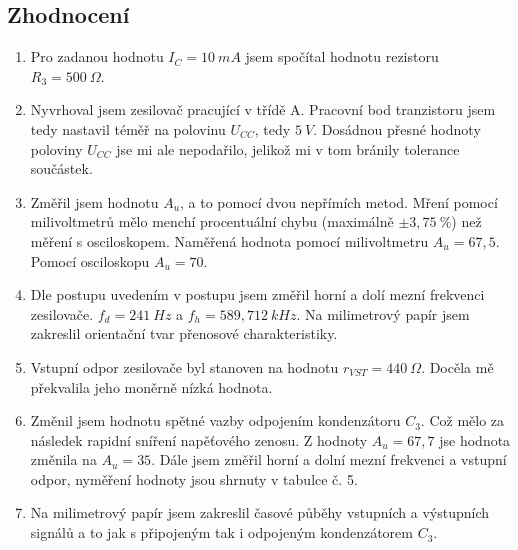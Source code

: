   \subsection*{Zhodnocení}
    \begin{enumerate}
      \item
        Pro zadanou hodnotu $I_C = 10~mA$ jsem spočítal hodnotu rezistoru $R_3 = 500~\Omega$.
      \item
        Nyvrhoval jsem zesilovač pracující v třídě A. Pracovní bod tranzistoru jsem tedy nastavil téměř na polovinu $U_{CC}$, tedy $5~V$. Dosádnou přesné hodnoty poloviny $U_{CC}$ jse mi ale nepodařilo, jelikož mi v tom bránily tolerance součástek.
      \item
      	Změřil jsem hodnotu $A_u$, a to pomocí dvou nepřímích metod. Mření pomocí milivoltmetrů mělo menchí procentuální chybu (maximálně $\pm 3,75~\%$) než měření s osciloskopem. Naměřená hodnota pomocí milivoltmetru $A_u = 67,5$. Pomocí osciloskopu $A_u = 70$.
      \item
        Dle postupu uvedením v postupu jsem změřil horní a dolí mezní frekvenci zesilovače. $f_d = 241~Hz$ a $f_h = 589,712~kHz$. Na milimetrový papír jsem zakreslil orientační tvar přenosové charakteristiky.
      \item
        Vstupní odpor zesilovače byl stanoven na hodnotu $r_{VST} = 440~\Omega$. Docěla mě překvalila jeho moněrně nízká hodnota.
      \item
      	Změnil jsem hodnotu spětné vazby odpojením kondenzátoru $C_3$. Což mělo za následek rapidní sníření napěťového zenosu. Z hodnoty $A_u = 67,7$ jse hodnota změnila na $A_u = 35$. Dále jsem změřil horní a dolní mezní frekvenci a vstupní odpor, nyměření hodnoty jsou shrnuty v tabulce č. 5.
      \item
      	Na milimetrový papír jsem zakreslil časové půběhy vstupních a výstupních signálů a to jak s připojeným tak i odpojeným kondenzátorem $C_3$.
    \end{enumerate}
